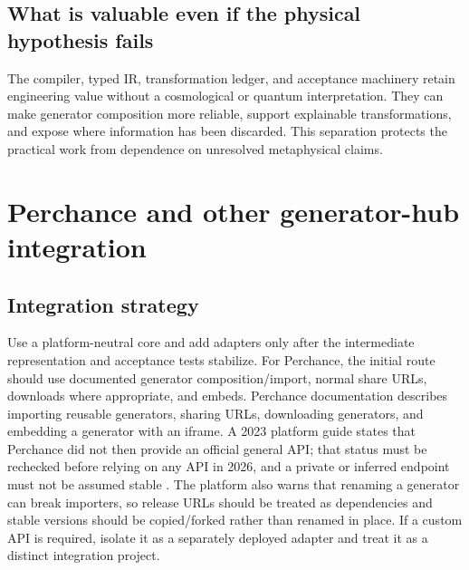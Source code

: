 \documentclass[11pt,oneside]{article}
\begin{document}
\subsection{What is valuable even if the physical hypothesis fails}
The compiler, typed IR, transformation ledger, and acceptance machinery retain engineering value without a cosmological or quantum interpretation. They can make generator composition more reliable, support explainable transformations, and expose where information has been discarded. This separation protects the practical work from dependence on unresolved metaphysical claims.

\section{Perchance and other generator-hub integration}
\subsection{Integration strategy}
Use a platform-neutral core and add adapters only after the intermediate representation and acceptance tests stabilize. For Perchance, the initial route should use documented generator composition/import, normal share URLs, downloads where appropriate, and embeds. Perchance documentation describes importing reusable generators, sharing URLs, downloading generators, and embedding a generator with an iframe. A 2023 platform guide states that Perchance did not then provide an official general API; that status must be rechecked before relying on any API in 2026, and a private or inferred endpoint must not be assumed stable \cite{perchanceembed,perchancecreate}. The platform also warns that renaming a generator can break importers, so release URLs should be treated as dependencies and stable versions should be copied/forked rather than renamed in place. If a custom API is required, isolate it as a separately deployed adapter and treat it as a distinct integration project.
\end{document}
